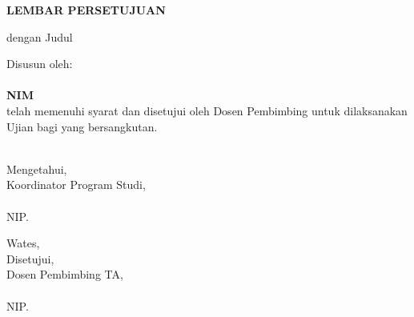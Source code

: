 
\newpage
{}
\begin{center}
    \begin{doublespace}
        \textbf{\large \MakeUppercase{lembar persetujuan}}
    \end{doublespace}
\end{center}

\begin{center}
    {\tipe} dengan Judul
\end{center}

\begin{center}
    \begin{doublespace}
        \textbf{\large \MakeUppercase {\judulid}}
    \end{doublespace}
\end{center}

\begin{center}
    Disusun oleh:\\
    \textbf{\penulis}\\
    \textbf{NIM \nim}\\[1.5cm]

    telah memenuhi syarat dan disetujui oleh Dosen Pembimbing untuk dilaksanakan Ujian {\tipe} bagi yang bersangkutan.\\[0.75cm]
\end{center}

\begin{minipage}{0.35\textwidth}
    \hfill\\[2em]
    Mengetahui,\\
    Koordinator Program Studi,\\[2cm]
    \koorprodi\\
    NIP. \NIPkoorprodi
\end{minipage}
\hfill
\begin{minipage}{0.35\textwidth}
    Wates, \tglpersetujuan\\[1em]
    Disetujui,\\
    Dosen Pembimbing TA,\\[2cm]
    \pembimbing\\
    NIP. \NIPpembimbing
\end{minipage}%
